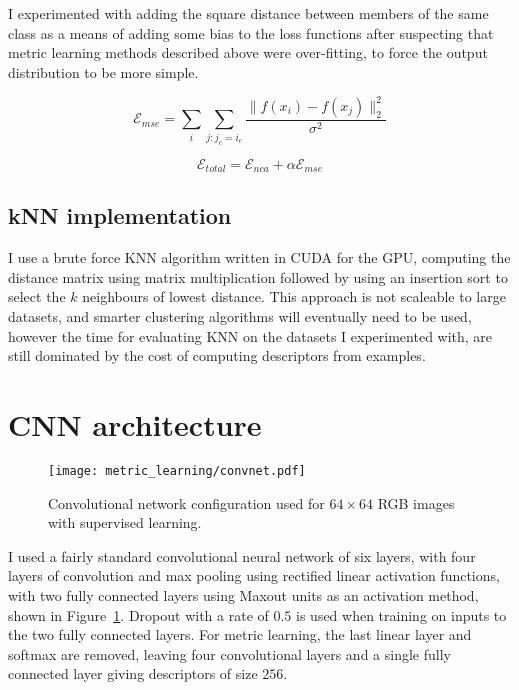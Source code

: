I experimented with adding the square distance between members of the same class as a means of adding some bias to the loss functions after suspecting that metric learning methods described above were over-fitting, to force the output distribution to be more simple. 

\begin{equation}
\label{eqn:mse}
\mathcal{E}_{mse} = \sum_i{ \sum_{j:j_c = i_c}  \frac {{\lVert f(x_i) - f(x_j) \rVert^2_2}} {\sigma^2} }
\end{equation}

\begin{equation}
\label{eqn:mse_total}
\mathcal{E}_{total} =  \mathcal{E}_{nca} + \alpha \mathcal{E}_{mse}
\end{equation}


\subsection {kNN implementation}

I use a brute force \gls{KNN} algorithm written in CUDA \cite{Garcia2008} for the \gls{GPU}, computing the distance matrix using matrix multiplication followed by using an insertion sort to select the $ k $ neighbours of lowest distance. This approach is not scaleable to large datasets, and smarter clustering algorithms will eventually need to be used, however the time for evaluating \gls{KNN} on the datasets I experimented with, are still dominated by the cost of computing descriptors from examples. 


\section {CNN architecture}


\begin{figure}[ht]
\centering
\texttt{[image: metric\_learning/convnet.pdf]}
\caption{Convolutional network configuration used for $64\times64$ RGB images with supervised learning.}
\label{fig:metric_convnet}
\end{figure}

I used a fairly standard convolutional neural network of six layers, with four layers of convolution and max pooling using rectified linear activation functions, with two fully connected layers using Maxout \cite{Springenberg2013} units as an activation method, shown in Figure~\ref{fig:metric_convnet}. Dropout \cite{HintonDropout} with a rate of $ 0.5 $ is used when training on inputs to the two fully connected layers. For metric learning, the last linear layer and softmax are removed, leaving four convolutional layers and a single fully connected layer giving descriptors of size $ 256 $.

